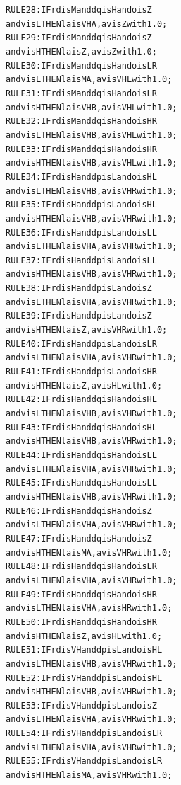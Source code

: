 \documentclass[11pt,twoside]{article}
\begin{document}
\begin{multicols}{2}
\begin{scriptsize}
\begin{alltt}
RULE 28: IF rd is M and dq is H and o is Z
    and v is L THEN la is VHA, av is Z with 1.0;
RULE 29: IF rd is M and dq is H and o is Z
    and v is H THEN la is Z, av is Z with 1.0;
RULE 30: IF rd is M and dq is H and o is LR
    and v is L THEN la is MA, av is VHL with 1.0;
RULE 31: IF rd is M and dq is H and o is LR
    and v is H THEN la is VHB, av is VHL with 1.0;
RULE 32: IF rd is M and dq is H and o is HR
    and v is L THEN la is VHB, av is VHL with 1.0;
RULE 33: IF rd is M and dq is H and o is HR
    and v is H THEN la is VHB, av is VHL with 1.0;
RULE 34: IF rd is H and dp is L and o is HL
    and v is L THEN la is VHB, av is VHR with 1.0;
RULE 35: IF rd is H and dp is L and o is HL
    and v is H THEN la is VHB, av is VHR with 1.0;
RULE 36: IF rd is H and dp is L and o is LL
    and v is L THEN la is VHA, av is VHR with 1.0;
RULE 37: IF rd is H and dp is L and o is LL
    and v is H THEN la is VHB, av is VHR with 1.0;
RULE 38: IF rd is H and dp is L and o is Z
    and v is L THEN la is VHA, av is VHR with 1.0;
RULE 39: IF rd is H and dp is L and o is Z
    and v is H THEN la is Z, av is VHR with 1.0;
RULE 40: IF rd is H and dp is L and o is LR
    and v is L THEN la is VHA, av is VHR with 1.0;
RULE 41: IF rd is H and dp is L and o is HR
    and v is H THEN la is Z, av is HL with 1.0;
RULE 42: IF rd is H and dq is H and o is HL
    and v is L THEN la is VHB, av is VHR with 1.0;
RULE 43: IF rd is H and dq is H and o is HL
    and v is H THEN la is VHB, av is VHR with 1.0;
RULE 44: IF rd is H and dq is H and o is LL
    and v is L THEN la is VHA, av is VHR with 1.0;
RULE 45: IF rd is H and dq is H and o is LL
    and v is H THEN la is VHB, av is VHR with 1.0;
RULE 46: IF rd is H and dq is H and o is Z
    and v is L THEN la is VHA, av is VHR with 1.0;
RULE 47: IF rd is H and dq is H and o is Z
    and v is H THEN la is MA, av is VHR with 1.0;
RULE 48: IF rd is H and dq is H and o is LR
    and v is L THEN la is VHA, av is VHR with 1.0;
RULE 49: IF rd is H and dq is H and o is HR
    and v is L THEN la is VHA, av is HR with 1.0;
RULE 50: IF rd is H and dq is H and o is HR
    and v is H THEN la is Z, av is HL with 1.0;
RULE 51: IF rd is VH and dp is L and o is HL
    and v is L THEN la is VHB, av is VHR with 1.0;
RULE 52: IF rd is VH and dp is L and o is HL
    and v is H THEN la is VHB, av is VHR with 1.0;
RULE 53: IF rd is VH and dp is L and o is Z
    and v is L THEN la is VHA, av is VHR with 1.0;
RULE 54: IF rd is VH and dp is L and o is LR
    and v is L THEN la is VHA, av is VHR with 1.0;
RULE 55: IF rd is VH and dp is L and o is LR
    and v is H THEN la is MA, av is VHR with 1.0;

\end{alltt}
\end{scriptsize}
\end{multicols}
\end{document}
